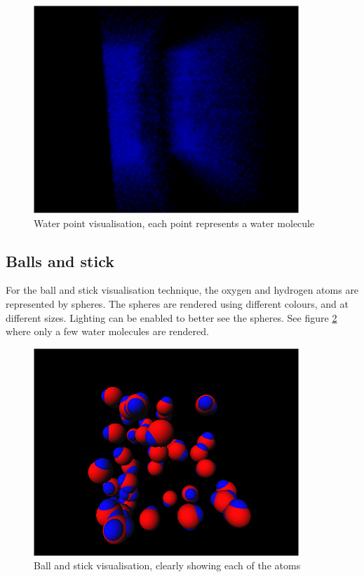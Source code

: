 \begin{figure}[h!]
  \begin{center}
    \includegraphics[width=100mm]{waterpoint}
  \end{center}
  \caption{Water point visualisation, each point represents a water molecule}
  \label{fig:implementation_waterpoint}
\end{figure}


\subsection{Balls and stick}
\label{sub:implementation_ballstick}

For the ball and stick visualisation technique, the oxygen and hydrogen atoms
are represented by spheres. The spheres are rendered using different colours,
and at different sizes. Lighting can be enabled to better see the spheres. See
figure \ref{fig:implementation_ballstick} where only a few water molecules are
rendered.

\begin{figure}[h!]
  \begin{center}
    \includegraphics[width=100mm]{ballstick}
  \end{center}
  \caption{Ball and stick visualisation, clearly showing each of the atoms}
  \label{fig:implementation_ballstick}
\end{figure}

